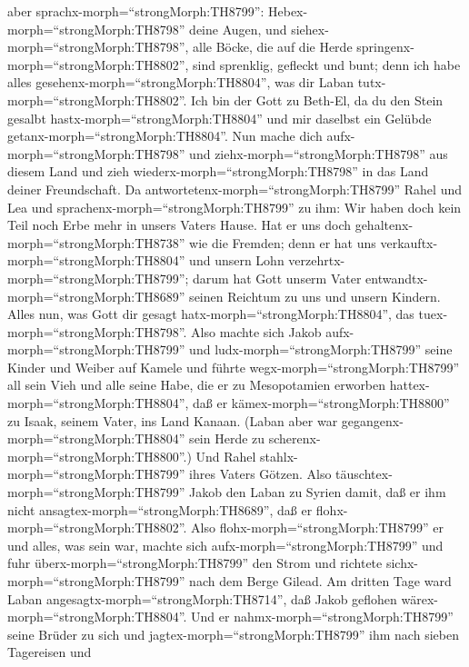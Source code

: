 aber sprachx-morph=``strongMorph:TH8799'':
Hebex-morph=``strongMorph:TH8798'' deine Augen, und
siehex-morph=``strongMorph:TH8798'', alle Böcke, die auf die Herde
springenx-morph=``strongMorph:TH8802'', sind sprenklig, gefleckt und
bunt; denn ich habe alles gesehenx-morph=``strongMorph:TH8804'', was dir
Laban tutx-morph=``strongMorph:TH8802''.  Ich bin der Gott
zu Beth-El, da du den Stein gesalbt hastx-morph=``strongMorph:TH8804''
und mir daselbst ein Gelübde getanx-morph=``strongMorph:TH8804''. Nun
mache dich aufx-morph=``strongMorph:TH8798'' und
ziehx-morph=``strongMorph:TH8798'' aus diesem Land und zieh
wiederx-morph=``strongMorph:TH8798'' in das Land deiner Freundschaft.
 Da antwortetenx-morph=``strongMorph:TH8799'' Rahel und Lea
und sprachenx-morph=``strongMorph:TH8799'' zu ihm: Wir haben doch kein
Teil noch Erbe mehr in unsers Vaters Hause.  Hat er uns
doch gehaltenx-morph=``strongMorph:TH8738'' wie die Fremden; denn er hat
uns verkauftx-morph=``strongMorph:TH8804'' und unsern Lohn
verzehrtx-morph=``strongMorph:TH8799'';  darum hat Gott
unserm Vater entwandtx-morph=``strongMorph:TH8689'' seinen Reichtum zu
uns und unsern Kindern. Alles nun, was Gott dir gesagt
hatx-morph=``strongMorph:TH8804'', das
tuex-morph=``strongMorph:TH8798''.  Also machte sich Jakob
aufx-morph=``strongMorph:TH8799'' und ludx-morph=``strongMorph:TH8799''
seine Kinder und Weiber auf Kamele  und führte
wegx-morph=``strongMorph:TH8799'' all sein Vieh und alle seine Habe, die
er zu Mesopotamien erworben hattex-morph=``strongMorph:TH8804'', daß er
kämex-morph=``strongMorph:TH8800'' zu Isaak, seinem Vater, ins Land
Kanaan.  (Laban aber war
gegangenx-morph=``strongMorph:TH8804'' sein Herde zu
scherenx-morph=``strongMorph:TH8800''.) Und Rahel
stahlx-morph=``strongMorph:TH8799'' ihres Vaters Götzen. 
Also täuschtex-morph=``strongMorph:TH8799'' Jakob den Laban zu Syrien
damit, daß er ihm nicht ansagtex-morph=``strongMorph:TH8689'', daß er
flohx-morph=``strongMorph:TH8802''.  Also
flohx-morph=``strongMorph:TH8799'' er und alles, was sein war, machte
sich aufx-morph=``strongMorph:TH8799'' und fuhr
überx-morph=``strongMorph:TH8799'' den Strom und richtete
sichx-morph=``strongMorph:TH8799'' nach dem Berge Gilead. 
Am dritten Tage ward Laban angesagtx-morph=``strongMorph:TH8714'', daß
Jakob geflohen wärex-morph=``strongMorph:TH8804''.  Und er
nahmx-morph=``strongMorph:TH8799'' seine Brüder zu sich und
jagtex-morph=``strongMorph:TH8799'' ihm nach sieben Tagereisen und
